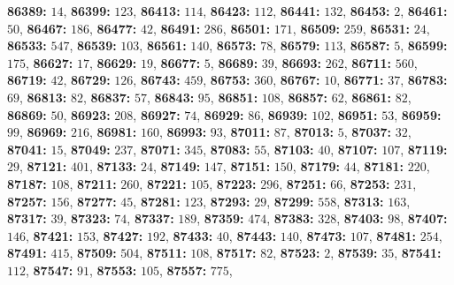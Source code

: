 \textsf{\bfseries 86389:} $14$, \textsf{\bfseries 86399:} $123$, \textsf{\bfseries 86413:} $114$, \textsf{\bfseries 86423:} $112$, \textsf{\bfseries 86441:} $132$, \textsf{\bfseries 86453:} $2$, \textsf{\bfseries 86461:} $50$, \textsf{\bfseries 86467:} $186$, \textsf{\bfseries 86477:} $42$, \textsf{\bfseries 86491:} $286$, \textsf{\bfseries 86501:} $171$, \textsf{\bfseries 86509:} $259$, \textsf{\bfseries 86531:} $24$, \textsf{\bfseries 86533:} $547$, \textsf{\bfseries 86539:} $103$, \textsf{\bfseries 86561:} $140$, \textsf{\bfseries 86573:} $78$, \textsf{\bfseries 86579:} $113$, \textsf{\bfseries 86587:} $5$, \textsf{\bfseries 86599:} $175$, \textsf{\bfseries 86627:} $17$, \textsf{\bfseries 86629:} $19$, \textsf{\bfseries 86677:} $5$, \textsf{\bfseries 86689:} $39$, \textsf{\bfseries 86693:} $262$, \textsf{\bfseries 86711:} $560$, \textsf{\bfseries 86719:} $42$, \textsf{\bfseries 86729:} $126$, \textsf{\bfseries 86743:} $459$, \textsf{\bfseries 86753:} $360$, \textsf{\bfseries 86767:} $10$, \textsf{\bfseries 86771:} $37$, \textsf{\bfseries 86783:} $69$, \textsf{\bfseries 86813:} $82$, \textsf{\bfseries 86837:} $57$, \textsf{\bfseries 86843:} $95$, \textsf{\bfseries 86851:} $108$, \textsf{\bfseries 86857:} $62$, \textsf{\bfseries 86861:} $82$, \textsf{\bfseries 86869:} $50$, \textsf{\bfseries 86923:} $208$, \textsf{\bfseries 86927:} $74$, \textsf{\bfseries 86929:} $86$, \textsf{\bfseries 86939:} $102$, \textsf{\bfseries 86951:} $53$, \textsf{\bfseries 86959:} $99$, \textsf{\bfseries 86969:} $216$, \textsf{\bfseries 86981:} $160$, \textsf{\bfseries 86993:} $93$, \textsf{\bfseries 87011:} $87$, \textsf{\bfseries 87013:} $5$, \textsf{\bfseries 87037:} $32$, \textsf{\bfseries 87041:} $15$, \textsf{\bfseries 87049:} $237$, \textsf{\bfseries 87071:} $345$, \textsf{\bfseries 87083:} $55$, \textsf{\bfseries 87103:} $40$, \textsf{\bfseries 87107:} $107$, \textsf{\bfseries 87119:} $29$, \textsf{\bfseries 87121:} $401$, \textsf{\bfseries 87133:} $24$, \textsf{\bfseries 87149:} $147$, \textsf{\bfseries 87151:} $150$, \textsf{\bfseries 87179:} $44$, \textsf{\bfseries 87181:} $220$, \textsf{\bfseries 87187:} $108$, \textsf{\bfseries 87211:} $260$, \textsf{\bfseries 87221:} $105$, \textsf{\bfseries 87223:} $296$, \textsf{\bfseries 87251:} $66$, \textsf{\bfseries 87253:} $231$, \textsf{\bfseries 87257:} $156$, \textsf{\bfseries 87277:} $45$, \textsf{\bfseries 87281:} $123$, \textsf{\bfseries 87293:} $29$, \textsf{\bfseries 87299:} $558$, \textsf{\bfseries 87313:} $163$, \textsf{\bfseries 87317:} $39$, \textsf{\bfseries 87323:} $74$, \textsf{\bfseries 87337:} $189$, \textsf{\bfseries 87359:} $474$, \textsf{\bfseries 87383:} $328$, \textsf{\bfseries 87403:} $98$, \textsf{\bfseries 87407:} $146$, \textsf{\bfseries 87421:} $153$, \textsf{\bfseries 87427:} $192$, \textsf{\bfseries 87433:} $40$, \textsf{\bfseries 87443:} $140$, \textsf{\bfseries 87473:} $107$, \textsf{\bfseries 87481:} $254$, \textsf{\bfseries 87491:} $415$, \textsf{\bfseries 87509:} $504$, \textsf{\bfseries 87511:} $108$, \textsf{\bfseries 87517:} $82$, \textsf{\bfseries 87523:} $2$, \textsf{\bfseries 87539:} $35$, \textsf{\bfseries 87541:} $112$, \textsf{\bfseries 87547:} $91$, \textsf{\bfseries 87553:} $105$, \textsf{\bfseries 87557:} $775$, 

